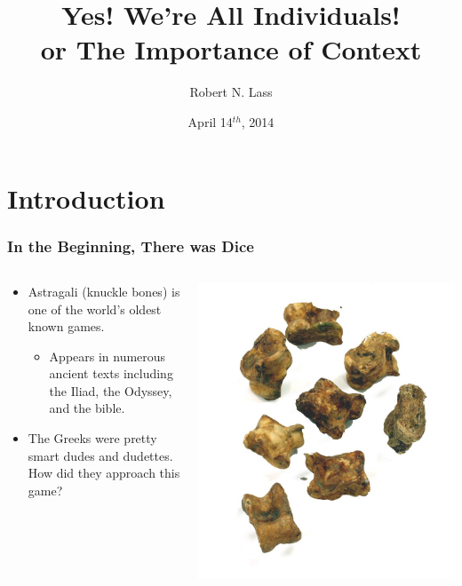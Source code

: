 \documentclass{beamer}
\title[!is\_num(me)]
{Yes!  We're All Individuals!\\or The Importance of Context}
\author[Lass]
{Robert N. Lass}
\institute[Drexel \& AWeber]
{
AWeber Communications\\
Chalfont, PA\\
\&\\
Drexel University\\
Philadelphia, PA
}
\date[DataPhilly]
{April 14$^{th}$, 2014}
\begin{document}
\begin{frame}
\titlepage
\end{frame}

\section{Introduction}
\begin{frame}
    \frametitle{In the Beginning, There was Dice}
    \begin{columns}{}
        \begin{column}{0.5\textwidth}
            \begin{block}{}
                \begin{itemize}
                    \item Astragali (knuckle bones) is one of the world's
                        oldest known games.
                    \begin{itemize}
                        \item Appears in numerous ancient texts including the
                            Iliad, the Odyssey, and the bible.
                    \end{itemize}
                    \item The Greeks were pretty smart dudes and dudettes.  How
                        did they approach this game?
                \end{itemize}
            \end{block}
        \end{column}
        \begin{column}{0.5\textwidth}
            \begin{block}{}
                \includegraphics[width=0.5\hsize]{art/knucklebones.jpg}

\end{block}
\end{column}
\end{columns}
\end{frame}
\end{document}
